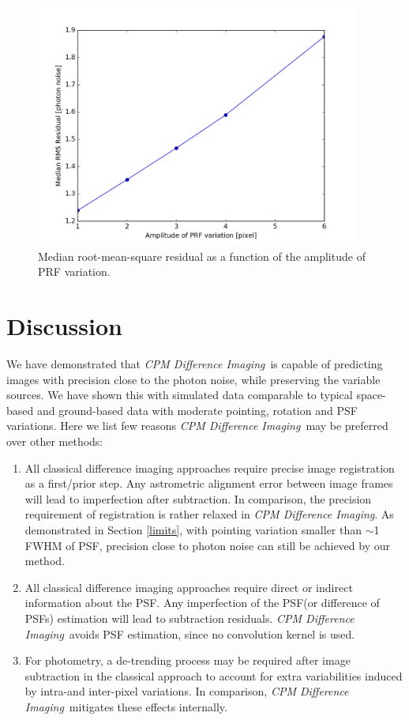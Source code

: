 \documentclass[12pt, preprint]{aastex}
\newcommand{\project}[1]{\textsl{#1}}
\newcommand{\cpmdiff}{\project{CPM Difference Imaging}}
\begin{document}
\begin{figure}[p]
\begin{center}
\includegraphics[width=0.95\textwidth]{prf_p}
\end{center}
\caption{
\label{prf_rms}
 Median root-mean-square residual as a function of the amplitude of PRF variation.
}
\end{figure}

\section{Discussion}
We have demonstrated that \cpmdiff\ is capable of predicting images with precision close to the photon noise, while preserving the variable sources. We have shown this with simulated data comparable to typical space-based and ground-based data with moderate pointing, rotation and PSF variations. 
Here we list few reasons \cpmdiff\ may be preferred over other methods:

\begin{enumerate}
\item All classical difference imaging approaches require precise image registration as a first/prior step. 
Any astrometric alignment error between image frames will lead to imperfection after subtraction.
In comparison, the precision requirement of registration is rather relaxed in \cpmdiff. 
As demonstrated in Section \ref{limits}, with pointing variation smaller than $\sim$1 FWHM of PSF, precision close to photon noise can still be achieved by our method.  

\item All classical difference imaging approaches require direct or indirect information about the PSF. 
Any imperfection of the PSF(or difference of PSFs) estimation will lead to subtraction residuals.
\cpmdiff\ avoids PSF estimation, since no convolution kernel is used.

\item For photometry, a de-trending process may be required after image subtraction in the classical approach to account for extra variabilities induced by intra-and inter-pixel variations.
In comparison, \cpmdiff\ mitigates these effects internally.
\end{enumerate}
\end{document}
